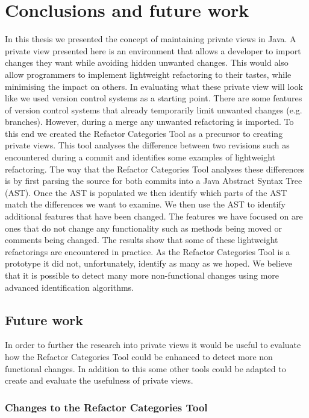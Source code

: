 
\chapter{Conclusions and future work}\label{C:con}

In this thesis we presented the concept of maintaining private views in Java.
A private view presented here is an environment that allows a developer to import changes they want while avoiding hidden unwanted changes. 
This would also allow programmers to implement lightweight refactoring to their tastes, while minimising the impact on others.  
In evaluating what these private view will look like we used version control systems as a starting point.
There are some features of version control systems that already temporarily limit unwanted changes (e.g. branches).
However, during a merge any unwanted refactoring is imported. 
To this end we created the Refactor Categories Tool as a precursor to creating private views. 
This tool analyses the difference between two revisions such as encountered during a commit and identifies some examples of lightweight refactoring.
The way that the Refactor Categories Tool analyses these differences is by first parsing the source for both commits into a Java Abstract Syntax Tree (AST).
Once the AST is populated we then identify which parts of the AST match the differences we want to examine.
We then use the AST to identify additional features that have been changed. 
The features we have focused on are ones that do not change any functionality such as methods being moved or comments being changed. 
The results show that some of these lightweight refactorings are encountered in practice.
As the Refactor Categories Tool is a prototype it did not, unfortunately, identify as many as we hoped.
We believe that it is possible to detect many more non-functional changes using more advanced identification algorithms.

\section{Future work}

In order to further the research into private views it would be useful to evaluate how the Refactor Categories Tool could be enhanced to detect more non functional changes. 
In addition to this some other tools could be adapted to create and evaluate the usefulness of private views.  
\subsection{Changes to the Refactor Categories Tool}

